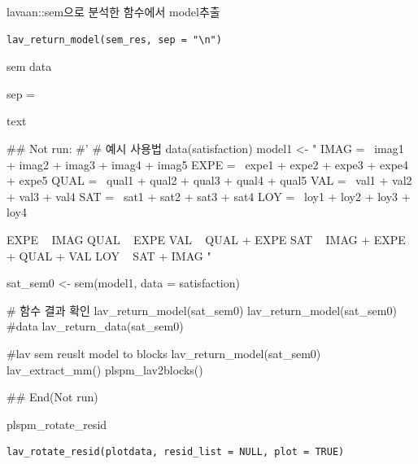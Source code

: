 \documentclass[a4paper]{book}
\begin{document}
%
\begin{Description}
lavaan::sem으로 분석한 함수에서 model추출
\end{Description}
%
\begin{Usage}
\begin{verbatim}
lav_return_model(sem_res, sep = "\n")
\end{verbatim}
\end{Usage}
%
\begin{Arguments}
\begin{ldescription}
\item[\code{sem\_res}] sem data

\item[\code{sep}] sep =
\end{ldescription}
\end{Arguments}
%
\begin{Value}
text
\end{Value}
%
\begin{Examples}
\begin{ExampleCode}

\#\# Not run: 
#'
# 예시 사용법
data(satisfaction)
model1 <- "
IMAG =~ imag1 + imag2 + imag3 + imag4 + imag5
EXPE =~ expe1 + expe2 + expe3 + expe4 + expe5
QUAL =~ qual1 + qual2 + qual3 + qual4 + qual5
VAL =~ val1 + val2 + val3 + val4
SAT =~ sat1 + sat2 + sat3 + sat4
LOY =~ loy1 + loy2 + loy3 + loy4

EXPE ~ IMAG
QUAL ~ EXPE
VAL ~  QUAL + EXPE
SAT ~ IMAG + EXPE + QUAL + VAL
LOY ~ SAT + IMAG
"

sat_sem0 <- sem(model1, data = satisfaction)

# 함수 결과 확인
lav_return_model(sat_sem0)
lav_return_model(sat_sem0)%
#data
lav_return_data(sat_sem0)

#lav sem reuslt  model to blocks
lav_return_model(sat_sem0)%
  lav_extract_mm()%
  plspm_lav2blocks()



## End(Not run)


\end{ExampleCode}
\end{Examples}
%
\begin{Description}
plspm\_rotate\_resid
\end{Description}
%
\begin{Usage}
\begin{verbatim}
lav_rotate_resid(plotdata, resid_list = NULL, plot = TRUE)
\end{verbatim}
\end{Usage}
\end{document}
